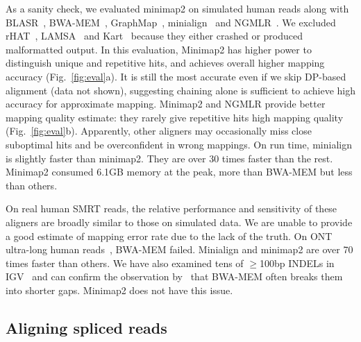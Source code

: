 \documentclass{bioinfo}
\begin{document}
As a sanity check, we evaluated minimap2 on simulated human reads along with
BLASR~\citep{Chaisson:2012aa}, 
BWA-MEM~\citep{Li:2013aa},
GraphMap~\citep{Sovic:2016aa},
minialign~\citep{Suzuki:2016} and
NGMLR~\citep{Sedlazeck169557}. We excluded rHAT~\citep{Liu:2016ab},
LAMSA~\citep{Liu:2017aa} and Kart~\citep{Lin:2017aa} because they either
crashed or produced malformatted output. In this evaluation, Minimap2 has
higher power to distinguish unique and repetitive hits, and achieves overall
higher mapping accuracy (Fig.~\ref{fig:eval}a). It is still the most accurate
even if we skip DP-based alignment (data not shown), suggesting chaining alone
is sufficient to achieve high accuracy for approximate mapping. Minimap2 and
NGMLR provide better mapping quality estimate: they rarely give repetitive hits
high mapping quality (Fig.~\ref{fig:eval}b).  Apparently, other aligners may
occasionally miss close suboptimal hits and be overconfident in wrong mappings.
On run time, minialign is slightly faster than minimap2. They are over 30 times
faster than the rest.  Minimap2 consumed 6.1GB memory at the peak, more than
BWA-MEM but less than others.

On real human SMRT reads, the relative performance and sensitivity of
these aligners are broadly similar to those on simulated data. We are unable to
provide a good estimate of mapping error rate due to the lack of the truth.  On
ONT ultra-long human reads~\citep{Jain128835}, BWA-MEM failed. Minialign and
minimap2 are over 70 times faster than others. We have also examined tens of
$\ge$100bp INDELs in IGV~\citep{Robinson:2011aa} and can confirm the
observation by~\citet{Sedlazeck169557} that BWA-MEM often breaks them into
shorter gaps. Minimap2 does not have this issue.

\subsection{Aligning spliced reads}
\end{document}
